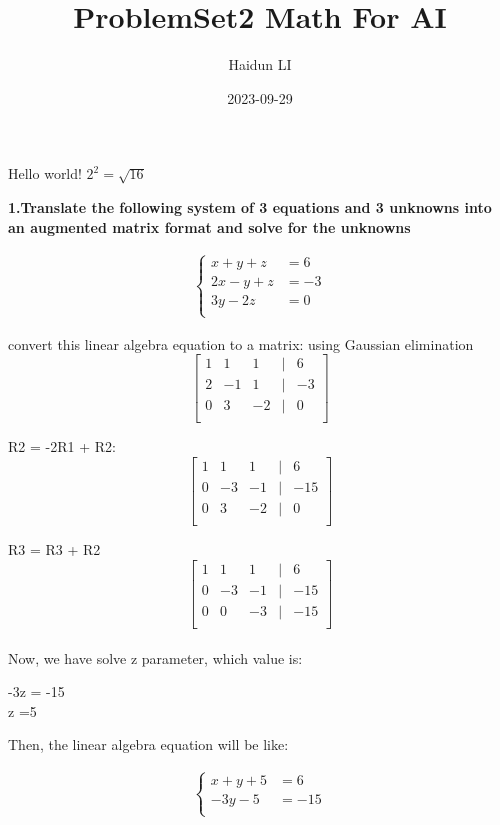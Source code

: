\documentclass[a4paper,12pt]{article} %
\title{ProblemSet2 Math For AI}
\author{Haidun LI}
\date{2023-09-29} %
\begin{document}
\noindent
Hello world! $2^2 = \sqrt{16}$

\noindent
\textbf{1.Translate the following system of 3 equations and 3 unknowns into an augmented matrix format and solve for the unknowns} \\

\vspace{2mm}

\begin{align*}
\begin{cases}
 	x + y + z & =  6 \\
	2x - y + z & = -3 \\
	3y - 2z & = 0 \\
\end{cases}
\end{align*}

convert this linear algebra equation to a matrix: using Gaussian elimination
\[
\begin{bmatrix}
    1 & 1 & 1 & | & 6 \\
    2 & -1 & 1 & | & -3 \\
    0 & 3 & -2 & | & 0 \\
\end{bmatrix}
\]

R2 = -2R1 + R2:
\[
\begin{bmatrix}
    1 & 1 & 1 & | & 6 \\
    0 & -3 & -1 & | & -15 \\
    0 & 3 & -2 & | & 0 \\
\end{bmatrix}
\]

R3 = R3 + R2
\[
\begin{bmatrix}
    1 & 1 & 1 & | & 6 \\
    0 & -3 & -1 & | & -15 \\
    0 & 0 & -3 & | & -15 \\
\end{bmatrix}
\] \\

Now, we have solve z parameter, which value is: \\
\begin{center}
    -3z = -15 \\  z =5
\end{center}

Then, the linear algebra equation will be like:

\begin{align*}
\begin{cases}
 	x + y + 5 & =  6 \\
	- 3y - 5 & = -15 \\
\end{cases}
\end{align*}
\end{document}
